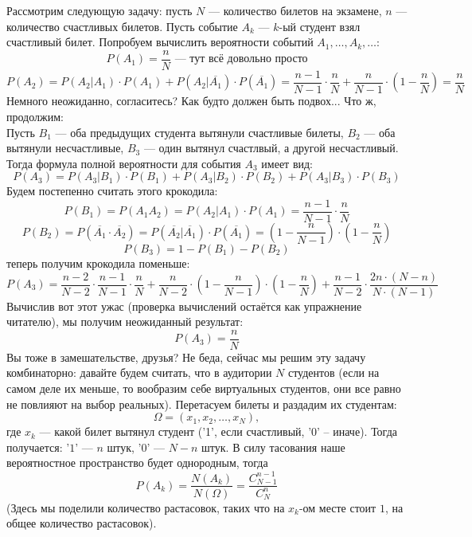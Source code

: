\documentclass[11pt]{article}
\begin{document}
\begin{example}
    Рассмотрим следующую задачу: пусть $N$ --- количество билетов на экзамене, $n$ ---  количество счастливых билетов. Пусть событие $A_k$ ---
    $k$-ый студент взял счастливый билет. Попробуем вычислить вероятности событий $A_1, \dots, A_k, \dots$:
    \[P(A_1) = \frac{n}{N} \text{ --- тут всё довольно просто}\]
    \[P(A_2) = P(A_2 | A_1) \cdot P(A_1) + P(A_2 | \overline{A_1}) \cdot P(\overline{A_1}) = \frac{n - 1}{N - 1} \cdot \frac{n}{N} + 
    \frac{n}{N - 1} \cdot \left(1 - \frac{n}{N}\right) = \frac{n}{N}\]
    Немного неожиданно, согласитесь? Как будто должен быть подвох... Что ж, продолжим: \\ Пусть $B_1$ --- оба предыдущих студента 
    вытянули счастливые билеты, $B_2$ --- оба вытянули несчастливые, $B_3$ --- один вытянул счастлвый, а другой несчастливый. Тогда формула полной 
    вероятности для события $A_3$ имеет вид: \[P(A_3) = P(A_3 | B_1) \cdot P(B_1) + P(A_3 | B_2) \cdot P(B_2) + P(A_3 | B_3) \cdot P(B_3)\]
    Будем постепенно считать этого крокодила: \[P(B_1) = P(A_1 A_2) = P(A_2 | A_1) \cdot P(A_1) = \frac{n - 1}{N - 1} \cdot \frac{n}{N}\]
    \[P(B_2) = P(\overline{A_1} \cdot \overline{A_2}) = P(\overline{A_2} | \overline{A_1}) \cdot P(\overline{A_1}) = 
    \left(1 - \frac{n}{N - 1}\right) \cdot \left(1 - \frac{n}{N}\right)\]
    \[P(B_3) = 1 - P(B_1) - P(B_2)\]
    теперь получим крокодила поменьше: \[P(A_3) = \frac{n - 2}{N - 2} \cdot \frac{n - 1}{N - 1} \cdot \frac{n}{N} + \frac{n}{N - 2} \cdot 
    \left(1 - \frac{n}{N - 1}\right) \cdot \left(1 - \frac{n}{N}\right) +  \frac{n - 1}{N - 2} \cdot \frac{2n \cdot (N - n)}{N \cdot(N - 1)}\]
    Вычислив вот этот ужас (проверка вычислений остаётся как упражнение читателю), мы получим неожиданный результат: \[ P(A_3) = \frac{n}{N} \]
    Вы тоже в замешательстве, друзья? Не беда, сейчас мы решим эту задачу комбинаторно: давайте будем считать, что в аудитории $N$ студентов 
    (если на самом деле их меньше, то вообразим себе виртуальных студентов, они все равно не повлияют на выбор реальных).
    Перетасуем билеты и раздадим их студентам: \[\Omega = (x_1, x_2, \dots, x_N),\] где $x_k$ --- какой билет вытянул студент ('1', если 
    счастливый, '0' -- иначе). Тогда получается: '$1$' --- $n$ штук, '$0$' --- $N - n$ штук. В силу тасования наше вероятностное пространство будет 
    однородным, тогда \[ P(A_k) = \frac{N(A_k)}{N(\Omega)} = \frac{C_{N - 1}^{n - 1}}{C_N^n}\]
    (Здесь мы поделили количество растасовок, таких что на $x_k$-ом месте стоит $1$, на общее количество растасовок).
\end{example}
\end{document}
